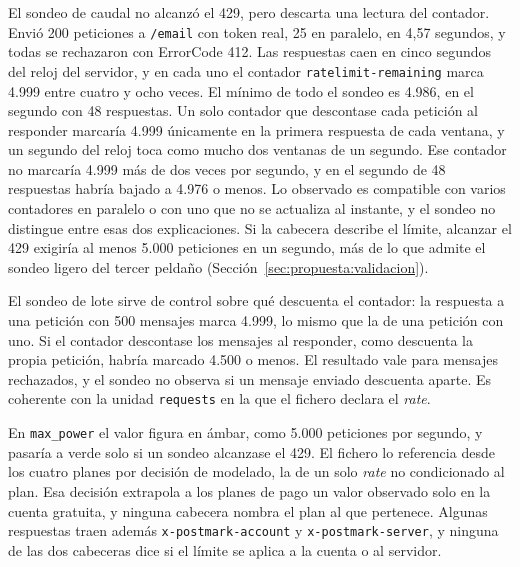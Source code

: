 El sondeo de caudal no alcanzó el 429, pero descarta una lectura del
contador. Envió 200 peticiones a \texttt{/email} con token real, 25 en
paralelo, en 4,57 segundos, y todas se rechazaron con ErrorCode 412. Las
respuestas caen en cinco segundos del reloj del servidor, y en cada uno el
contador \texttt{ratelimit-remaining} marca 4.999 entre cuatro y ocho
veces. El mínimo de todo el sondeo es 4.986, en el segundo con 48
respuestas. Un solo contador que descontase cada petición al responder
marcaría 4.999 únicamente en la primera respuesta de cada ventana, y un
segundo del reloj toca como mucho dos ventanas de un segundo. Ese contador
no marcaría 4.999 más de dos veces por segundo, y en el segundo de 48
respuestas habría bajado a 4.976 o menos. Lo observado es compatible con
varios contadores en paralelo o con uno que no se actualiza al instante, y
el sondeo no distingue entre esas dos explicaciones.
Si la cabecera describe el límite, alcanzar el 429 exigiría al menos 5.000
peticiones en un segundo, más de lo que admite el sondeo ligero del tercer
peldaño (Sección~\ref{sec:propuesta:validacion}).

El sondeo de lote sirve de control sobre qué descuenta el contador: la
respuesta a una petición con 500 mensajes marca 4.999, lo mismo que la de
una petición con uno. Si el contador descontase los mensajes al responder,
como descuenta la propia petición, habría marcado 4.500 o menos. El
resultado vale para mensajes rechazados, y el sondeo no observa si un
mensaje enviado descuenta aparte. Es coherente con la unidad
\texttt{requests} en la que el fichero declara el \textit{rate}.

En \texttt{max\_power} el valor figura en ámbar, como 5.000 peticiones por
segundo, y pasaría a verde solo si un sondeo alcanzase el 429. El fichero
lo referencia desde los cuatro planes por decisión de modelado, la de un
solo \textit{rate} no condicionado al plan. Esa decisión extrapola a los
planes de pago un valor observado solo en la cuenta gratuita, y ninguna
cabecera nombra el plan al que pertenece. Algunas respuestas traen además
\texttt{x-postmark-account} y \texttt{x-postmark-server}, y ninguna de las
dos cabeceras dice si el límite se aplica a la cuenta o al servidor.

